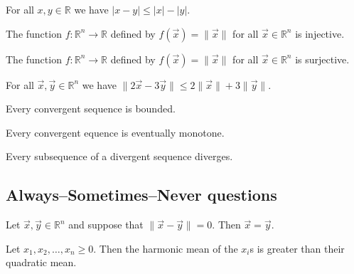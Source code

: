 \begin{chapex} %
\label{cqRealNumbersTFBegin}
For all $x,y \in \mathbb{R}$ we have $|x-y| \le |x| - |y|$.
\end{chapex}

\begin{chapex} %
The function $f : \mathbb{R}^n \to \mathbb{R}$ defined by $f(\vec x) = \lVert \vec x \rVert$ for all $\vec x \in \mathbb{R}^n$ is injective.
\end{chapex}

\begin{chapex} %
The function $f : \mathbb{R}^n \to \mathbb{R}$ defined by $f(\vec x) = \lVert \vec x \rVert$ for all $\vec x \in \mathbb{R}^n$ is surjective.
\end{chapex}

\begin{chapex} %
For all $\vec x, \vec y \in \mathbb{R}^n$ we have $\lVert 2\vec x - 3\vec y \rVert \le 2\lVert \vec x \rVert + 3\lVert \vec y \rVert$.
\end{chapex}

\begin{chapex} %
Every convergent sequence is bounded.
\end{chapex}

\begin{chapex} %
Every convergent equence is eventually monotone.
\end{chapex}

\begin{chapex} %
\label{cqRealNumbersTFEnd}
Every subsequence of a divergent sequence diverges.
\end{chapex}

\subsection*{Always--Sometimes--Never questions}


\begin{chapex} %
\label{cqRealNumbersASNBegin}
Let $\vec x, \vec y \in \mathbb{R}^n$ and suppose that $\lVert \vec x - \vec y \rVert = 0$. Then $\vec x = \vec y$.
\end{chapex}

\begin{chapex} %
Let $x_1, x_2, \dots, x_n \ge 0$. Then the harmonic mean of the $x_i$s is greater than their quadratic mean.
\end{chapex}

